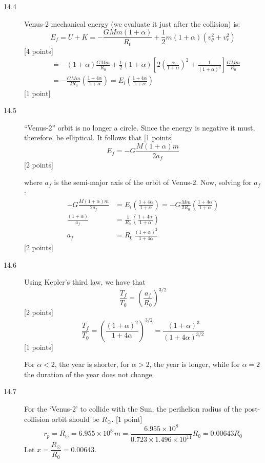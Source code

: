 \begin{description}
\item[14.4] Venus-2 mechanical energy (we evaluate it just after the
  collision) is:
  \[
    E_f = U + K = -\frac{GMm(1 + \alpha)}{R_0}
      + \frac{1}{2}m(1 + \alpha)\left(v_\theta^2 + v_r^2\right)
  \]
  \hfill[4 points]
  \begin{align*}
    &= -(1 + \alpha)\frac{GMm}{R_0} + \frac{1}{2}(1 + \alpha)
      \left[2\left(\frac{\alpha}{1 + \alpha}\right)^2
      + \frac{1}{(1 + \alpha)^2}\right]\frac{GMm}{R_0} \\
    &= -\frac{GMm}{2R_0}\left(\frac{1 + 4\alpha}{1 + \alpha}\right)
      = E_i\left(\frac{1 + 4\alpha}{1 + \alpha}\right)
  \end{align*}
  \hfill[1 point]

\item[14.5] ``Venus-2'' orbit is no longer a circle. Since the energy is
  negative it must, therefore, be elliptical. It follows that
  \hfill[1 points] %
  \[
    E_f = -G\frac{M(1 + \alpha)m}{2a_f}
  \]
  \hfill[2 points]

  where $a_f$ is the semi-major axis of the orbit of Venus-2. Now, solving for
  $a_f$:
  \begin{align*}
    -G\frac{M(1 + \alpha)m}{2a_f}
      &= E_i\left(\frac{1 + 4\alpha}{1 + \alpha}\right)
       = -G\frac{Mm}{2R_0}\left(\frac{1 + 4\alpha}{1 + \alpha}\right) \\
    \frac{(1 + \alpha)}{a_f}
      &= \frac{1}{R_0}\left(\frac{1 + 4\alpha}{1 + \alpha}\right) \\
    a_f &= R_0\,\frac{(1 + \alpha)^2}{1 + 4\alpha}
  \end{align*}
  \hfill[2 points]

\item[14.6] Using Kepler's third law, we have that
  \[
    \frac{T_f}{T_0} = \left(\frac{a_f}{R_0}\right)^{3/2}
  \]
  \hfill[2 points]
  \[
    \frac{T_f}{T_0}
      = \left(\frac{(1 + \alpha)^2}{1 + 4\alpha}\right)^{3/2}
      = \frac{(1 + \alpha)^3}{(1 + 4\alpha)^{3/2}}
  \]
  \hfill[1 points] %

  For $\alpha < 2$, the year is shorter, for $\alpha > 2$, the year is longer,
  while for $\alpha = 2$ the duration of the year does not change.

\item[14.7] For the `Venus-2' to collide with the Sun, the perihelion radius
  of the post-collision orbit should be $R_\odot$. \hfill[1 point]
  \[
    r_p = R_\odot = 6.955\times10^{8}\,m
      = \frac{6.955\times10^{8}}{0.723\times1.496\times10^{11}}R_0
      = 0.00643R_0
  \]
  Let $x = \dfrac{R_\odot}{R_0} = 0.00643$.


\end{description}
